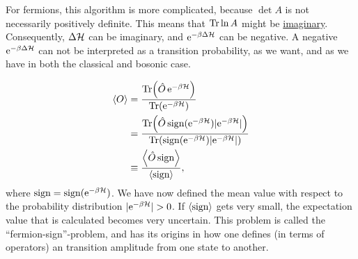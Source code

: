 For fermions, this algorithm is more complicated, because \(\det A\) is not necessarily positively definite. This means that \(\Tr\ln A\) might be \underline{imaginary}. Consequently, \(\Delta \mathcal{H}\) can be imaginary, and \(\mathrm{e}^{-\beta\Delta\mathcal{H}}\) can be negative. A negative \(\mathrm{e}^{-\beta\Delta\mathcal{H}}\) can not be interpreted as a transition probability, as we want, and as we have in both the classical and bosonic case. 

\begin{align*}
\ev{O} &= \frac{\Tr(\hat{O}\,\e^{-\beta\Ha})}{\Tr(\e^{-\beta\Ha})} \\
&= \frac{\Tr(\hat{O}\,\sign (\e^{-\beta\Ha})|\e^{-\beta\Ha}|)}{\Tr(\sign (\e^{-\beta\Ha})|\e^{-\beta\Ha}|)} \\
&\equiv \frac{\ev{\hat{O}\,\sign}}{\ev{\sign}},
\end{align*}
where \(\text{sign} = \text{sign}(\mathrm{e}^{-\beta\mathcal{H}})\). We have now defined the mean value with respect to the probability distribution \(|\e^{-\beta\Ha}|>0\). If \(\ev{\sign}\) gets very small, the expectation value that is calculated becomes very uncertain. This problem is called the ``fermion-sign''-problem, and has its origins in how one defines (in terms of operators) an transition amplitude from one state to another. 
